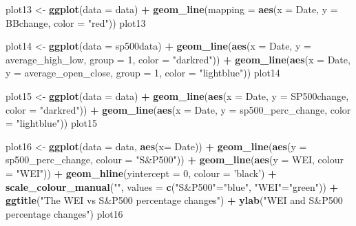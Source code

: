 \documentclass[]{article}
\newenvironment{Shaded}{\begin{snugshade}}{\end{snugshade}}
\newcommand{\KeywordTok}[1]{\textcolor[rgb]{0.13,0.29,0.53}{\textbf{#1}}}
\newcommand{\DataTypeTok}[1]{\textcolor[rgb]{0.13,0.29,0.53}{#1}}
\newcommand{\DecValTok}[1]{\textcolor[rgb]{0.00,0.00,0.81}{#1}}
\newcommand{\StringTok}[1]{\textcolor[rgb]{0.31,0.60,0.02}{#1}}
\newcommand{\OperatorTok}[1]{\textcolor[rgb]{0.81,0.36,0.00}{\textbf{#1}}}
\newcommand{\NormalTok}[1]{#1}
\begin{document}
\begin{Shaded}
\begin{Highlighting}[]
\NormalTok{plot13 <-}\StringTok{ }\KeywordTok{ggplot}\NormalTok{(}\DataTypeTok{data =}\NormalTok{ data) }\OperatorTok{+}\StringTok{ }
\StringTok{  }\KeywordTok{geom_line}\NormalTok{(}\DataTypeTok{mapping =} \KeywordTok{aes}\NormalTok{(}\DataTypeTok{x =}\NormalTok{ Date, }\DataTypeTok{y =}\NormalTok{ BBchange, }\DataTypeTok{color =} \StringTok{"red"}\NormalTok{))}
\NormalTok{plot13}

\NormalTok{plot14 <-}\StringTok{ }\KeywordTok{ggplot}\NormalTok{(}\DataTypeTok{data =}\NormalTok{ sp500data) }\OperatorTok{+}\StringTok{ }
\StringTok{  }\KeywordTok{geom_line}\NormalTok{(}\KeywordTok{aes}\NormalTok{(}\DataTypeTok{x =}\NormalTok{ Date, }\DataTypeTok{y =}\NormalTok{ average_high_low, }\DataTypeTok{group =} \DecValTok{1}\NormalTok{, }\DataTypeTok{color =} \StringTok{"darkred"}\NormalTok{)) }\OperatorTok{+}
\StringTok{  }\KeywordTok{geom_line}\NormalTok{(}\KeywordTok{aes}\NormalTok{(}\DataTypeTok{x =}\NormalTok{ Date, }\DataTypeTok{y =}\NormalTok{ average_open_close, }\DataTypeTok{group =} \DecValTok{1}\NormalTok{, }\DataTypeTok{color =} \StringTok{"lightblue"}\NormalTok{))}
\NormalTok{plot14}

\NormalTok{plot15 <-}\StringTok{ }\KeywordTok{ggplot}\NormalTok{(}\DataTypeTok{data =}\NormalTok{ data) }\OperatorTok{+}\StringTok{ }
\StringTok{  }\KeywordTok{geom_line}\NormalTok{(}\KeywordTok{aes}\NormalTok{(}\DataTypeTok{x =}\NormalTok{ Date, }\DataTypeTok{y =}\NormalTok{ SP500change, }\DataTypeTok{color =} \StringTok{"darkred"}\NormalTok{)) }\OperatorTok{+}\StringTok{ }
\StringTok{  }\KeywordTok{geom_line}\NormalTok{(}\KeywordTok{aes}\NormalTok{(}\DataTypeTok{x =}\NormalTok{ Date, }\DataTypeTok{y =}\NormalTok{ sp500_perc_change, }\DataTypeTok{color =} \StringTok{"lightblue"}\NormalTok{))}
\NormalTok{plot15}


\NormalTok{plot16 <-}\StringTok{ }\KeywordTok{ggplot}\NormalTok{(}\DataTypeTok{data =}\NormalTok{ data, }\KeywordTok{aes}\NormalTok{(}\DataTypeTok{x=}\NormalTok{ Date)) }\OperatorTok{+}\StringTok{ }
\StringTok{  }\KeywordTok{geom_line}\NormalTok{(}\KeywordTok{aes}\NormalTok{(}\DataTypeTok{y =}\NormalTok{ sp500_perc_change, }\DataTypeTok{colour =} \StringTok{"S&P500"}\NormalTok{)) }\OperatorTok{+}\StringTok{ }
\StringTok{  }\KeywordTok{geom_line}\NormalTok{(}\KeywordTok{aes}\NormalTok{(}\DataTypeTok{y =}\NormalTok{ WEI, }\DataTypeTok{colour =} \StringTok{"WEI"}\NormalTok{)) }\OperatorTok{+}
\StringTok{  }\KeywordTok{geom_hline}\NormalTok{(}\DataTypeTok{yintercept =} \DecValTok{0}\NormalTok{, }\DataTypeTok{colour =} \StringTok{'black'}\NormalTok{) }\OperatorTok{+}\StringTok{ }
\StringTok{  }\KeywordTok{scale_colour_manual}\NormalTok{(}\StringTok{""}\NormalTok{, }\DataTypeTok{values =} \KeywordTok{c}\NormalTok{(}\StringTok{"S&P500"}\NormalTok{=}\StringTok{"blue"}\NormalTok{, }\StringTok{"WEI"}\NormalTok{=}\StringTok{"green"}\NormalTok{)) }\OperatorTok{+}
\StringTok{  }\KeywordTok{ggtitle}\NormalTok{(}\StringTok{"The WEI vs S&P500 percentage changes"}\NormalTok{) }\OperatorTok{+}
\StringTok{  }\KeywordTok{ylab}\NormalTok{(}\StringTok{"WEI and S&P500 percentage changes"}\NormalTok{) }
\NormalTok{plot16}


\end{Highlighting}
\end{Shaded}
\end{document}
